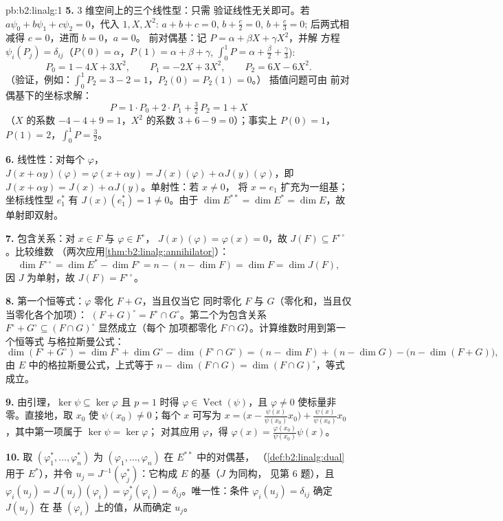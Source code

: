 \begin{solution}{pb:b2:linalg:1}
\textbf{5.} $3$ 维空间上的三个线性型：只需
验证线性无关即可。若 $a\psi_0 + b\psi_1 + c\psi_2 = 0$，代入 $1, X,
X^2$: $a + b + c = 0$, $b + \frac c2 = 0$, $b + \frac c3 = 0$;
后两式相减得 $c = 0$，进而 $b = 0$，$a = 0$。
前对偶基：记 $P = \alpha + \beta X + \gamma X^2$，并解
方程 $\psi_i(P_j) = \delta_{ij}$（$P(0) = \alpha$，$P(1) =
\alpha + \beta + \gamma$, $\int_0^1 P = \alpha + \frac\beta2 +
\frac\gamma3$):
\[
P_0 = 1 - 4X + 3X^2, \qquad
P_1 = -2X + 3X^2, \qquad
P_2 = 6X - 6X^2 .
\]
（验证，例如：$\int_0^1 P_2 = 3 - 2 = 1$，$P_2(0) = P_2(1) = 0$。）
插值问题可由
前对偶基下的坐标求解：
\[
P = 1\cdot P_0 + 2\cdot P_1 + \tfrac32\, P_2 = 1 + X
\]
（$X$ 的系数 $-4 - 4 + 9 = 1$，$X^2$ 的系数 $3 + 6 - 9 =
0$）；事实上 $P(0) = 1$，$P(1) = 2$，$\int_0^1 P = \frac32$。

\textbf{6.} 线性性：对每个 $\varphi$，$J(x + \alpha
y)(\varphi) = \varphi(x + \alpha y) = J(x)(\varphi) + \alpha
J(y)(\varphi)$，即 $J(x + \alpha y) = J(x) + \alpha J(y)$。单射性：若 $x \neq 0$，
将 $x = e_1$ 扩充为一组基；坐标线性型 $e_1^*$ 有
$J(x)(e_1^*) = 1 \neq 0$。由于 $\dim E^{**} = \dim E^* = \dim
E$，故单射即双射。

\textbf{7.} 包含关系：对 $x \in F$ 与 $\varphi \in F^\circ$，
$J(x)(\varphi) = \varphi(x) = 0$，故 $J(F) \subseteq
F^{\circ\circ}$。比较维数
（两次应用\cref{thm:b2:linalg:annihilator}）：
\[
\dim F^{\circ\circ} = \dim E^* - \dim F^\circ
= n - (n - \dim F) = \dim F = \dim J(F),
\]
因 $J$ 为单射，故 $J(F) = F^{\circ\circ}$。

\textbf{8.} 第一个恒等式：$\varphi$ 零化 $F + G$，当且仅当它
同时零化 $F$ 与 $G$（零化和，当且仅当零化各个加项）：
$(F+G)^\circ = F^\circ \cap G^\circ$。第二个为包含关系
$F^\circ + G^\circ \subseteq (F \cap G)^\circ$ 显然成立（每个
加项都零化 $F \cap G$）。计算维数时用到第一个恒等式
与格拉斯曼公式：
\[
\dim(F^\circ + G^\circ) = \dim F^\circ + \dim G^\circ -
\dim(F^\circ \cap G^\circ)
= (n - \dim F) + (n - \dim G) - \bigl(n - \dim(F +
G)\bigr),
\]
由 $E$ 中的格拉斯曼公式，上式等于 $n - \dim(F \cap G) = \dim(F
\cap G)^\circ$，等式成立。

\textbf{9.} 由引理，$\ker\psi \subseteq \ker\varphi$ 且
$p = 1$ 时得 $\varphi \in \operatorname{Vect}(\psi)$，且
$\varphi \neq 0$ 使标量非零。直接地，取 $x_0$
使 $\psi(x_0) \neq 0$；每个 $x$ 可写为 $x = \bigl(x -
\frac{\psi(x)}{\psi(x_0)}x_0\bigr) + \frac{\psi(x)}{\psi(x_0)}
x_0$，其中第一项属于 $\ker\psi = \ker\varphi$；
对其应用 $\varphi$，得 $\varphi(x) = \frac{\varphi(x_0)}{\psi(x_0)}\psi(x)$。

\textbf{10.} 取 $(\varphi_1^*, \dots,
\varphi_n^*)$ 为 $(\varphi_1, \dots, \varphi_n)$ 在 $E^{**}$ 中的对偶基，
（\cref{def:b2:linalg:dual}用于 $E^*$），并令 $u_j =
J^{-1}(\varphi_j^*)$：它构成 $E$ 的基（$J$ 为同构，
见第 6 题），且 $\varphi_i(u_j) = J(u_j)(\varphi_i) =
\varphi_j^*(\varphi_i) = \delta_{ij}$。唯一性：条件
$\varphi_i(u_j) = \delta_{ij}$ 确定 $J(u_j)$ 在
基 $(\varphi_i)$ 上的值，从而确定 $u_j$。


\end{solution}
